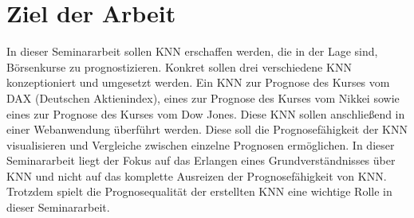 \section{Ziel der Arbeit}
\label{section:Ziel der Arbeit}
In dieser Seminararbeit sollen KNN erschaffen werden, die in der Lage sind, Börsenkurse zu prognostizieren. Konkret sollen drei verschiedene KNN konzeptioniert und umgesetzt werden. Ein KNN zur Prognose des Kurses vom DAX (Deutschen Aktienindex), eines zur Prognose des Kurses vom Nikkei sowie eines zur Prognose des Kurses vom Dow Jones. Diese KNN sollen anschließend in einer Webanwendung überführt werden. Diese soll die Prognosefähigkeit der KNN visualisieren und Vergleiche zwischen einzelne Prognosen ermöglichen. In dieser Seminararbeit liegt der Fokus auf das Erlangen eines Grundverständnisses über KNN und nicht auf das komplette Ausreizen der Prognosefähigkeit von KNN. Trotzdem spielt die Prognosequalität der erstellten KNN eine wichtige Rolle in dieser Seminararbeit.
